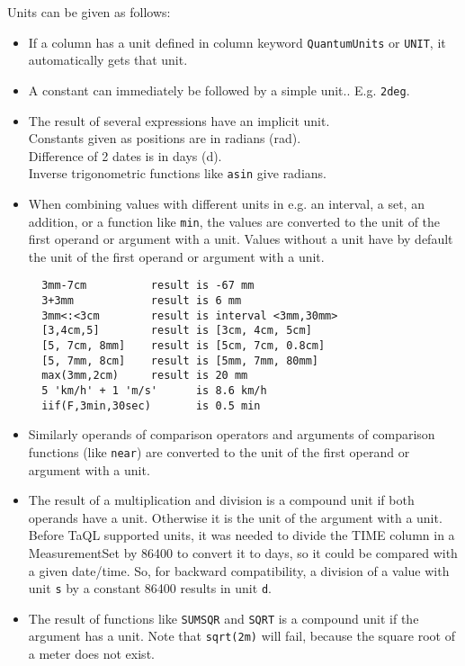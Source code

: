 Units can be given as follows:
\begin{itemize}
 \item If a column has a unit defined in column keyword
	\texttt{QuantumUnits} or \texttt{UNIT}, it automatically
	gets that unit.
 \item A constant can immediately be followed by a simple unit..
	E.g. \texttt{2deg}.
 \item The result of several expressions have an implicit unit.
	\\Constants given as positions are in radians (rad).
	\\Difference of 2 dates is in days (d).
	\\Inverse trigonometric functions like \texttt{asin} give radians.
 \item When combining values with different units in e.g. an interval,
	a set, an addition, or a function like \texttt{min}, the values
	are converted to the unit of the first operand or argument
	with a unit. Values without a unit have by default the unit
	of the first operand or argument with a unit.
\begin{verbatim}
  3mm-7cm          result is -67 mm
  3+3mm            result is 6 mm
  3mm<:<3cm        result is interval <3mm,30mm>
  [3,4cm,5]        result is [3cm, 4cm, 5cm]
  [5, 7cm, 8mm]    result is [5cm, 7cm, 0.8cm]
  [5, 7mm, 8cm]    result is [5mm, 7mm, 80mm]
  max(3mm,2cm)     result is 20 mm
  5 'km/h' + 1 'm/s'      is 8.6 km/h
  iif(F,3min,30sec)       is 0.5 min
\end{verbatim}
 \item Similarly operands of comparison operators and arguments of
	comparison functions (like \texttt{near}) are converted to
	the unit of the first operand or argument with a unit.
 \item The result of a multiplication and division is a compound unit
	if both operands have a unit. Otherwise it is the unit of
	the argument with a unit.
        \\Before TaQL supported units, it was needed to divide the
	TIME column in a MeasurementSet by 86400 to convert it to
	days, so it could be compared with a given date/time.
	So, for backward compatibility, a division of a value with
	unit \texttt{s} by a constant 86400 results in unit \texttt{d}.
 \item The result of functions like \texttt{SUMSQR} and \texttt{SQRT} is a
	compound unit if the argument has a unit.
	Note that \texttt{sqrt(2m)} will fail, because the square root
	of a meter does not exist.

\end{itemize}
